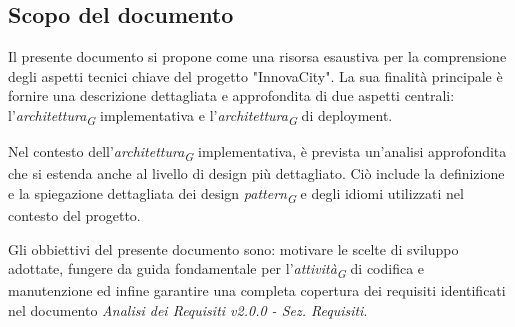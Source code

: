 \subsection{Scopo del documento}
Il presente documento si propone come una risorsa esaustiva per la comprensione degli aspetti tecnici chiave del progetto "InnovaCity". La sua finalità principale è fornire una descrizione dettagliata e approfondita di due aspetti centrali: l'\textit{architettura}\textsubscript{\textit{G}} implementativa e l'\textit{architettura}\textsubscript{\textit{G}} di deployment.

Nel contesto dell'\textit{architettura}\textsubscript{\textit{G}} implementativa, è prevista un'analisi approfondita che si estenda anche al livello di design più dettagliato. Ciò include la definizione e la spiegazione dettagliata dei design \textit{pattern}\textsubscript{\textit{G}} e degli idiomi utilizzati nel contesto del progetto.

Gli obbiettivi del presente documento sono: motivare le scelte di sviluppo adottate, fungere da guida fondamentale per l'\textit{attività}\textsubscript{\textit{G}} di codifica e manutenzione ed infine garantire una completa copertura dei requisiti identificati nel documento \textit{Analisi dei Requisiti v2.0.0 - Sez. Requisiti}.